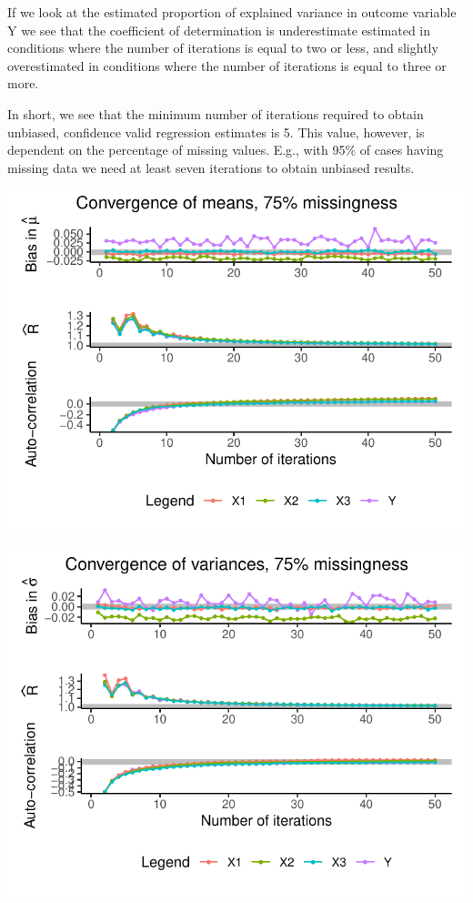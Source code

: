 \documentclass[Royal,times,sageh]{sagej}
\begin{document}
If we look at the estimated proportion of explained variance in outcome
variable Y we see that the coefficient of determination is underestimate
estimated in conditions where the number of iterations is equal to two
or less, and slightly overestimated in conditions where the number of
iterations is equal to three or more.

In short, we see that the minimum number of iterations required to
obtain unbiased, confidence valid regression estimates is 5. This value,
however, is dependent on the percentage of missing values. E.g., with
95\% of cases having missing data we need at least seven iterations to
obtain unbiased results.

\begin{flushleft}\includegraphics{manuscript_files/figure-latex/unnamed-chunk-3-1} \end{flushleft}

\begin{flushleft}\includegraphics{manuscript_files/figure-latex/unnamed-chunk-4-1} \end{flushleft}
\end{document}
